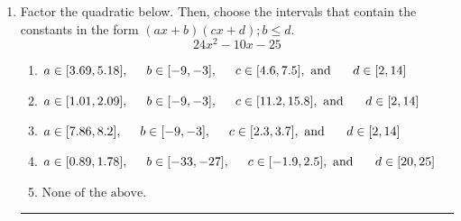 \documentclass[14pt]{extbook}
\newcommand{\litem}[1]{\item#1\hspace*{-1cm}\rule{\textwidth}{0.4pt}}
\begin{document}
\begin{enumerate}
{\begin{enumerate}[label=\Alph*.]
\end{enumerate} }
\litem{
Factor the quadratic below. Then, choose the intervals that contain the constants in the form $(ax+b)(cx+d); b \leq d.$\[ 24x^{2} -10 x -25 \]\begin{enumerate}[label=\Alph*.]
\item \( a \in [3.69, 5.18], \hspace*{5mm} b \in [-9, -3], \hspace*{5mm} c \in [4.6, 7.5], \text{ and } \hspace*{5mm} d \in [2, 14] \)
\item \( a \in [1.01, 2.09], \hspace*{5mm} b \in [-9, -3], \hspace*{5mm} c \in [11.2, 15.8], \text{ and } \hspace*{5mm} d \in [2, 14] \)
\item \( a \in [7.86, 8.2], \hspace*{5mm} b \in [-9, -3], \hspace*{5mm} c \in [2.3, 3.7], \text{ and } \hspace*{5mm} d \in [2, 14] \)
\item \( a \in [0.89, 1.78], \hspace*{5mm} b \in [-33, -27], \hspace*{5mm} c \in [-1.9, 2.5], \text{ and } \hspace*{5mm} d \in [20, 25] \)
\item \( \text{None of the above.} \)


\end{enumerate}}
\end{enumerate}
\end{document}
